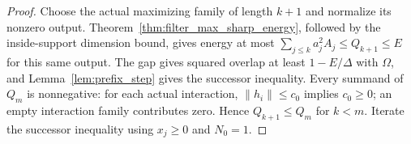 \begin{proof}
    \leanok
    Choose the actual maximizing family of length $k+1$ and normalize its
    nonzero output. Theorem~\ref{thm:filter_max_sharp_energy}, followed by
    the inside-support dimension bound, gives energy at most
    $\sum_{j\le k}a_j^2A_j\le Q_{k+1}\le E$ for this same output.
    The gap gives squared overlap at least $1-E/\Delta$ with $\Omega$,
    and Lemma~\ref{lem:prefix_step} gives the successor inequality.
    Every summand of $Q_m$ is nonnegative: for each actual interaction,
    $\lVert h_i\rVert\le c_0$ implies $c_0\ge0$; an empty interaction
    family contributes zero. Hence $Q_{k+1}\le Q_m$ for $k<m$.
    Iterate the successor inequality using $x_j\ge0$ and $N_0=1$.
\end{proof}

